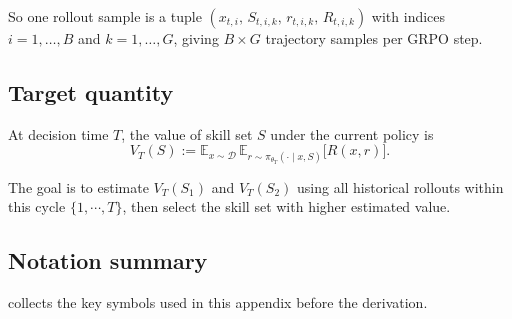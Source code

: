 So one rollout sample is a tuple $(x_{t,i},\, S_{t,i,k},\, r_{t,i,k},\, R_{t,i,k})$ with indices $i = 1, \ldots, B$ and $k = 1, \ldots, G$, giving $B \times G$ trajectory samples per GRPO step.

\subsection{Target quantity}
\label{app:iw:target}

\begin{definition}
\label{def:value}
At decision time $T$, the value of skill set $S$ under the current policy is
\begin{equation}
\label{eq:iw_value}
    V_T(S) := \mathbb{E}_{x \sim \mathcal{D}}\, \mathbb{E}_{r \sim \pi_{\theta_T}(\cdot \mid x, S)}\bigl[R(x, r)\bigr].
\end{equation}
\end{definition}

The goal is to estimate $V_T(S_1)$ and $V_T(S_2)$ using all historical rollouts within this cycle $\{1,\cdots,T\}$, then select the skill set with higher estimated value.

\subsection{Notation summary}
\label{app:iw:notation}

 collects the key symbols used in this appendix before the derivation.

